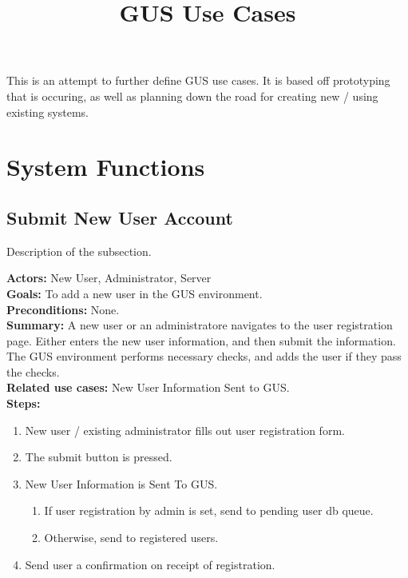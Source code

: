 \documentclass[12pt]{article}
\title{GUS Use Cases}
\date{}
\begin{document}
  \maketitle
  This is an attempt to further define GUS use cases. It is based
  off prototyping that is occuring, as well as planning down the
  road for creating new / using existing systems.
 
\section{System Functions}
 
 \subsection{Submit New User Account}
 Description of the subsection.
 
 
 \textbf{Actors:} New User, Administrator, Server \\

 
 \textbf{Goals:} To add a new user in the GUS environment. \\
 
 
 \textbf{Preconditions:} None. \\
 
 
 \textbf{Summary:} A new user or an administratore navigates to the user
      registration page. Either enters the new user
      information, and then submit the information. The GUS
      environment performs necessary checks, and adds the
      user if they pass the checks. \\
 
 
 \textbf{Related use cases:} New User Information Sent to GUS. \\
 
 
 \textbf{Steps:}
\begin{enumerate}
  \item New user / existing administrator fills out user registration form.
  \item The submit button is pressed.
  \item New User Information is Sent To GUS.
  \begin{enumerate}
   \item If user registration by admin is set, send to pending user db queue.
   \item Otherwise, send to registered users.
  \end{enumerate}
  \item Send user a confirmation on receipt of registration.
\end{enumerate}
   
\end{document}
